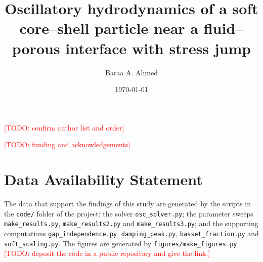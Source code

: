 \documentclass[aip,pof,reprint,amsmath,amssymb,nofootinbib]{revtex4-2}
\newcommand{\TODO}[1]{\textcolor{red}{[TODO: #1]}}
\theoremstyle{plain}
\theoremstyle{definition}
\theoremstyle{remark}
\begin{document}
\title{Oscillatory hydrodynamics of a soft core--shell particle near a fluid--porous interface with stress jump}

\author{Baraa A. Ahmed}
\email{\TODO{corresponding e-mail}}
\affiliation{\TODO{affiliation}}
\TODO{confirm author list and order}

\date{\today}

\begin{abstract}

\end{abstract}

\maketitle









\appendix


\begin{acknowledgments}
\TODO{funding and acknowledgements}
\end{acknowledgments}

\section*{Data Availability Statement}
{\sloppy The data that support the findings of this study are generated by the scripts in the \texttt{code/}
folder of the project: the solver \texttt{osc\_solver.py}; the parameter sweeps \texttt{make\_results.py},
\texttt{make\_results2.py} and \texttt{make\_results3.py}; and the supporting computations
\texttt{gap\_independence.py}, \texttt{damping\_peak.py}, \texttt{basset\_fraction.py} and
\texttt{soft\_scaling.py}. The figures are generated by \texttt{figures/make\_figures.py}. \TODO{deposit the code in a
public repository and give the link.}\par}


\end{document}
